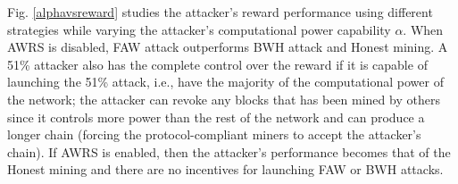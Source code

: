 

Fig. \ref{alphavsreward} studies the attacker's reward performance using different strategies while varying the attacker's computational power capability $\alpha$.
When AWRS is disabled, FAW attack outperforms BWH attack and Honest mining.
A 51\% attacker also has the complete control over the reward if it is capable of launching the 51\% attack, i.e., have the majority of the computational power of the network;
the attacker can revoke any blocks that has been mined by others since it controls more power than the rest of the network and can produce a longer chain (forcing the protocol-compliant miners to accept the attacker's chain).
If AWRS is enabled, %
then the attacker's performance becomes that of the Honest mining
and there are no incentives for launching FAW or BWH attacks.



